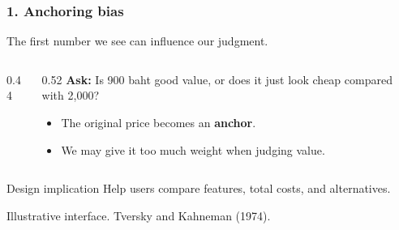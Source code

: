 \documentclass{beamer}
\begin{document}
\begin{frame}
    \frametitle{1. Anchoring bias}
    \small
    The first number we see can influence our judgment.
    \medskip
    \begin{columns}[c]
    \begin{column}{0.44\textwidth}
    \centering
    \end{column}
    \begin{column}{0.52\textwidth}
        \textbf{Ask:} Is 900 baht good value, or does it just look cheap compared with 2,000?
        \medskip
        \begin{itemize}
            \item The original price becomes an \textbf{anchor}.
            \item We may give it too much weight when judging value.
        \end{itemize}
    \end{column}
    \end{columns}
    \begin{block}{Design implication}
        Help users compare features, total costs, and alternatives.
    \end{block}
    {\tiny Illustrative interface. Tversky and Kahneman (1974).}
\end{frame}
\end{document}

